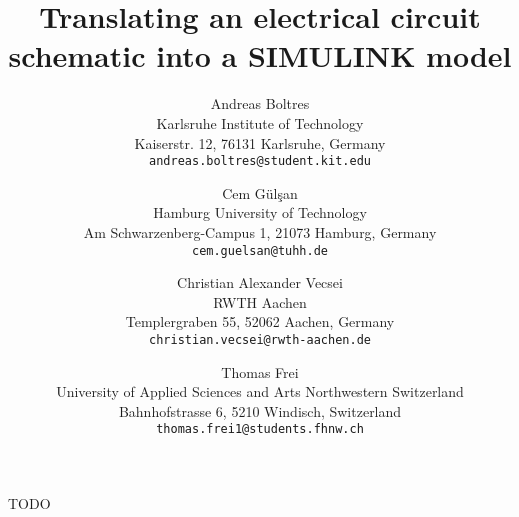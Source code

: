 \documentclass[10pt,twocolumn,letterpaper]{article}
\begin{document}
\title{Translating an electrical circuit schematic into a SIMULINK model}

\author{Andreas Boltres\\
Karlsruhe Institute of Technology\\
Kaiserstr. 12, 76131 Karlsruhe, Germany\\
{\tt\small andreas.boltres@student.kit.edu}
\and
Cem G\"ul\c{s}an\\
Hamburg University of Technology\\
Am Schwarzenberg-Campus 1, 21073 Hamburg, Germany\\
{\tt\small cem.guelsan@tuhh.de}
\and
Christian Alexander Vecsei\\
RWTH Aachen\\
Templergraben 55, 52062 Aachen, Germany\\
{\tt\small christian.vecsei@rwth-aachen.de}
\and
Thomas Frei\\
University of Applied Sciences and Arts Northwestern Switzerland\\
Bahnhofstrasse 6, 5210 Windisch, Switzerland\\
{\tt\small thomas.frei1@students.fhnw.ch}
}

\maketitle

TODO
\end{document}

